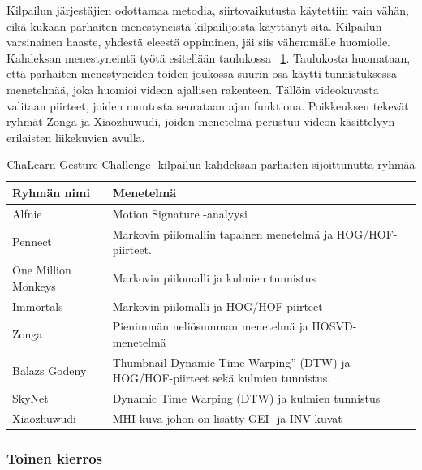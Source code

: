 Kilpailun järjestäjien odottamaa metodia, siirtovaikutusta käytettiin vain vähän, eikä kukaan parhaiten menestyneistä kilpailijoista käyttänyt sitä.
Kilpailun varsinainen haaste, yhdestä eleestä oppiminen, jäi siis vähemmälle huomiolle. \citep {6239178} \\

Kahdeksan menestyneintä työtä esitellään taulukossa ~\ref{table:dvbt_param}. Taulukosta huomataan, että parhaiten menestyneiden töiden
joukossa suurin osa käytti tunnistuksessa menetelmää, joka huomioi videon ajallisen rakenteen. Tällöin videokuvasta valitaan piirteet, joiden
muutosta seurataan ajan funktiona. Poikkeuksen tekevät ryhmät Zonga ja Xiaozhuwudi, joiden menetelmä perustuu videon käsittelyyn erilaisten liikekuvien avulla. 
\citep {6239178}\\

\begin{table}[th]
\caption{ChaLearn Gesture Challenge -kilpailun kahdeksan parhaiten sijoittunutta ryhmää}
\label{table:dvbt_param}
\begin{center}
\begin{tabular}{|p{}|p{}|} 
    \hline
Ryhmän nimi & Menetelmä \\
    \hline
    \hline
Alfnie & Motion Signature -analyysi\\ 
    \hline
Pennect & Markovin piilomallin tapainen menetelmä ja HOG/HOF-piirteet.\\
    \hline
One Million Monkeys & Markovin piilomalli ja kulmien tunnistus\\
    \hline
Immortals & Markovin piilomalli ja HOG/HOF-piirteet\\
    \hline
Zonga & Pienimmän neliösumman menetelmä ja HOSVD-menetelmä\\
    \hline
Balazs Godeny & Thumbnail Dynamic Time Warping” (DTW) ja HOG/HOF-piirteet sekä kulmien tunnistus.\\
    \hline
SkyNet & Dynamic Time Warping (DTW) ja kulmien tunnistus\\
    \hline
Xiaozhuwudi & MHI-kuva johon on lisätty GEI- ja INV-kuvat\\
    \hline	
\end{tabular}
\end{center}
\end{table}

\newpage
\subsubsection {Toinen kierros}

